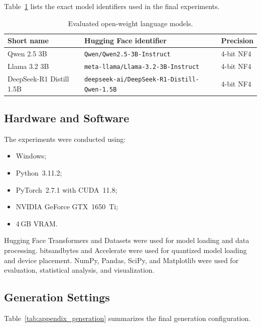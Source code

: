 Table~\ref{tab:appendix_models} lists the exact model identifiers used in the
final experiments.

\begin{table}[t]
\centering
\small
\caption{Evaluated open-weight language models.}
\label{tab:appendix_models}
\begin{tabular}{lll}
\toprule
\textbf{Short name} &
\textbf{Hugging Face identifier} &
\textbf{Precision} \\
\midrule
Qwen 2.5 3B &
\texttt{Qwen/Qwen2.5-3B-Instruct} &
4-bit NF4 \\

Llama 3.2 3B &
\texttt{meta-llama/Llama-3.2-3B-Instruct} &
4-bit NF4 \\

DeepSeek-R1 Distill 1.5B &
\texttt{deepseek-ai/DeepSeek-R1-Distill-Qwen-1.5B} &
4-bit NF4 \\
\bottomrule
\end{tabular}
\end{table}

\subsection{Hardware and Software}

The experiments were conducted using:

\begin{itemize}
    \item Windows;
    \item Python~3.11.2;
    \item PyTorch~2.7.1 with CUDA~11.8;
    \item NVIDIA GeForce GTX~1650~Ti;
    \item 4\,GB VRAM.
\end{itemize}

Hugging Face Transformers and Datasets were used for model loading and data
processing. bitsandbytes and Accelerate were used for quantized model loading
and device placement. NumPy, Pandas, SciPy, and Matplotlib were used for
evaluation, statistical analysis, and visualization.

\subsection{Generation Settings}

Table~\ref{tab:appendix_generation} summarizes the final generation
configuration.

